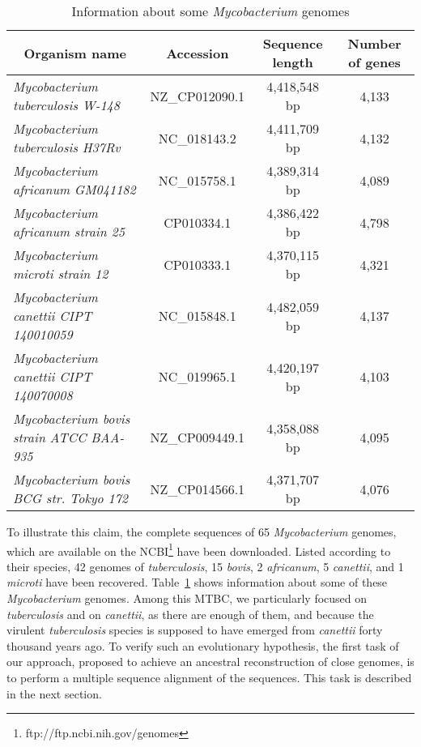 \documentclass[runningheads,a4paper]{llncs}
\begin{document}
\begin{table}[!htb]
\caption{Information about some \textit{Mycobacterium} genomes}
\tiny
\begin{center}
\begin{tabular}{l|c|c|c}
\multicolumn{1}{c|}{Organism name} & Accession & Sequence length & Number of genes\\ \hline\hline
\textit{Mycobacterium tuberculosis W-148} & NZ\_CP012090.1 & 4,418,548 bp & 4,133\\
\textit{Mycobacterium tuberculosis H37Rv} & NC\_018143.2 & 4,411,709 bp & 4,132  \\
\textit{Mycobacterium africanum GM041182} & NC\_015758.1 & 4,389,314 bp & 4,089  \\  
\textit{Mycobacterium africanum strain 25}& CP010334.1 & 4,386,422 bp & 4,798 \\ 
\textit{Mycobacterium microti strain 12} & CP010333.1 & 4,370,115 bp & 4,321 \\ 
\textit{Mycobacterium canettii CIPT 140010059} & NC\_015848.1 & 4,482,059 bp & 4,137  \\
\textit{Mycobacterium canettii CIPT 140070008} & NC\_019965.1 & 4,420,197 bp & 4,103  \\ 
\textit{Mycobacterium bovis strain ATCC BAA-935} & NZ\_CP009449.1 & 4,358,088 bp & 4,095 \\ 
\textit{Mycobacterium bovis BCG str. Tokyo 172} & NZ\_CP014566.1 & 4,371,707 bp & 4,076 
\end{tabular}
\end{center}
\label{tab:Mycobacterium}
\end{table}


To illustrate this claim, the complete sequences of 65 \textit{Mycobacterium} genomes, which are available on the NCBI\footnote{ftp://ftp.ncbi.nih.gov/genomes} 
have been downloaded. Listed according to their species, 42 genomes of \textit{tuberculosis}, 15 \textit{bovis}, 2 \textit{africanum}, 5 \textit{canettii}, and 1 \textit{microti} have been recovered. Table~\ref{tab:Mycobacterium} shows information about some of these  \textit{Mycobacterium} genomes. Among this MTBC, we particularly focused on \textit{tuberculosis} and on \textit{canettii}, as there are enough of them, and because the virulent \textit{tuberculosis} species is supposed to have emerged from \textit{canettii} forty thousand years ago. 
To verify such an evolutionary hypothesis, the first task of our approach, proposed to achieve an ancestral reconstruction of close genomes, is to perform a multiple sequence alignment of the sequences. This task is described in the next section.
\end{document}
